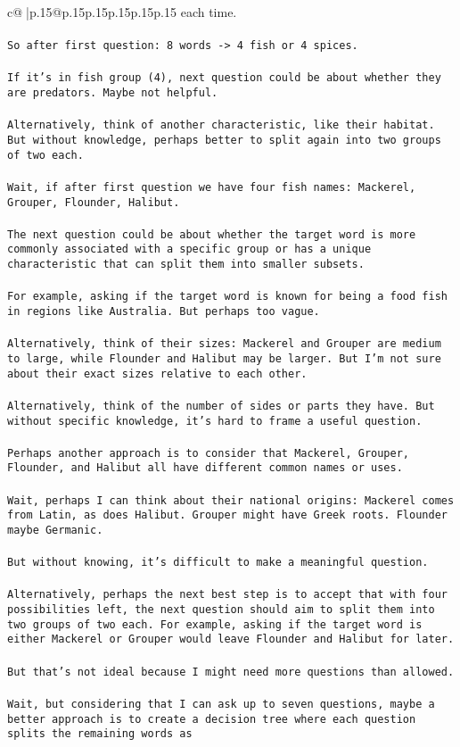 \documentclass{article}
\begin{document}
{\begin{supertabular}{c@{$\;$}|p{.15\linewidth}@{}p{.15\linewidth}p{.15\linewidth}p{.15\linewidth}p{.15\linewidth}p{.15\linewidth}}
{{{each time.\\ \tt \\ \tt So after first question: 8 words -> 4 fish or 4 spices.\\ \tt \\ \tt If it's in fish group (4), next question could be about whether they are predators. Maybe not helpful.\\ \tt \\ \tt Alternatively, think of another characteristic, like their habitat. But without knowledge, perhaps better to split again into two groups of two each.\\ \tt \\ \tt Wait, if after first question we have four fish names: Mackerel, Grouper, Flounder, Halibut.\\ \tt \\ \tt The next question could be about whether the target word is more commonly associated with a specific group or has a unique characteristic that can split them into smaller subsets.\\ \tt \\ \tt For example, asking if the target word is known for being a food fish in regions like Australia. But perhaps too vague.\\ \tt \\ \tt Alternatively, think of their sizes: Mackerel and Grouper are medium to large, while Flounder and Halibut may be larger. But I'm not sure about their exact sizes relative to each other.\\ \tt \\ \tt Alternatively, think of the number of sides or parts they have. But without specific knowledge, it's hard to frame a useful question.\\ \tt \\ \tt Perhaps another approach is to consider that Mackerel, Grouper, Flounder, and Halibut all have different common names or uses.\\ \tt \\ \tt Wait, perhaps I can think about their national origins: Mackerel comes from Latin, as does Halibut. Grouper might have Greek roots. Flounder maybe Germanic.\\ \tt \\ \tt But without knowing, it's difficult to make a meaningful question.\\ \tt \\ \tt Alternatively, perhaps the next best step is to accept that with four possibilities left, the next question should aim to split them into two groups of two each. For example, asking if the target word is either Mackerel or Grouper would leave Flounder and Halibut for later.\\ \tt \\ \tt But that's not ideal because I might need more questions than allowed.\\ \tt \\ \tt Wait, but considering that I can ask up to seven questions, maybe a better approach is to create a decision tree where each question splits the remaining words as }}}
\end{supertabular}}
\end{document}
